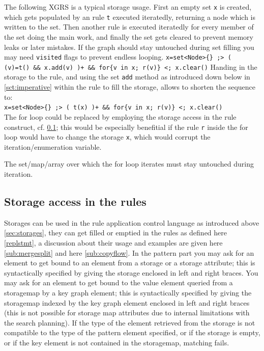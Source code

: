 \begin{example}
The following XGRS is a typical storage usage.
First an empty set \texttt{x} is created, which gets populated by an rule \texttt{t} executed iteratedly, returning a node which is written to the set.
Then another rule is executed iteratedly for every member of the set doing the main work, and finally the set gets cleared to prevent memory leaks or later mistakes.
If the graph should stay untouched during set filling you may need \texttt{visited} flags to prevent endless looping.
\verb#x=set<Node>{} ;> ( (v)=t() && x.add(v) )+ && for{v in x; r(v)} <; x.clear()#
Handing in the storage to the rule, and using the set \texttt{add} method as introduced down below in \ref{sct:imperative} within the rule to fill the storage, allows to shorten the sequence to:\\
\verb#x=set<Node>{} ;> ( t(x) )+ && for{v in x; r(v)} <; x.clear()#\\
The for loop could be replaced by employing the storage access in the rule construct, cf. \ref{sub:storageaccess}; this would be especially benefitial if the rule \texttt{r} inside the for loop would have to change the storage \texttt{x}, which would corrupt the iteration/enumeration variable.
\end{example}

\begin{note}
The set/map/array over which the for loop iterates must stay untouched during iteration.
\end{note}


\subsection{Storage access in the rules} \label{sub:storageaccess}

Storages can be used in the rule application control language as introduced above \ref{sec:storages}, they can get filled or emptied in the rules as defined here \ref{replstmt}, a discussion about their usage and examples are given here \ref{sub:mergesplit} and here \ref{sub:copyflow}.
In the pattern part you may ask for an element to get bound to an element from a storage or a storage attribute;
this is syntactically specified by giving the storage enclosed in left and right braces.
You may ask for an element to get bound to the value element queried from a storagemap by a key graph element;
this is syntactically specified by giving the storagemap indexed by the key graph element enclosed in left and right braces
(this is not possible for storage map attributes due to internal limitations with the search planning).
If the type of the element retrieved from the storage is not compatible to the type of the pattern element specified,
or if the storage is empty, or if the key element is not contained in the storagemap, matching fails.

